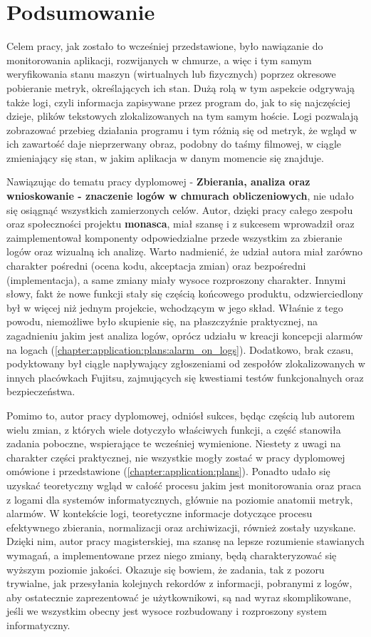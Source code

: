 \chapter[Podsumowanie]{Podsumowanie}
\label{chapter:summary}

Celem pracy, jak zostało to wcześniej przedstawione, było nawiązanie do monitorowania aplikacji, 
rozwijanych w chmurze, a więc i tym samym weryfikowania stanu maszyn (wirtualnych lub fizycznych) poprzez
okresowe pobieranie metryk, określających ich stan. Dużą rolą w tym aspekcie odgrywają także logi, czyli
informacja zapisywane przez program do, jak to się najczęściej dzieje, plików tekstowych zlokalizowanych
na tym samym hoście. Logi pozwalają zobrazować przebieg działania programu i tym różnią się od metryk, że
wgląd w ich zawartość daje nieprzerwany obraz, podobny do taśmy filmowej, w ciągle zmieniający się stan, w jakim
aplikacja w danym momencie się znajduje. 

Nawiązując do tematu pracy dyplomowej - \textbf{Zbierania, analiza oraz wnioskowanie - znaczenie logów w chmurach
    obliczeniowych}, nie udało się osiągnąć wszystkich zamierzonych celów. Autor, dzięki pracy całego zespołu oraz
społeczności projektu \textbf{monasca}, miał szansę i z sukcesem wprowadził oraz zaimplementował komponenty
odpowiedzialne przede wszystkim za zbieranie logów oraz wizualną ich analizę. Warto nadmienić, że udział autora
miał zarówno charakter pośredni (ocena kodu, akceptacja zmian) oraz bezpośredni (implementacja), a same zmiany
miały wysoce rozproszony charakter. Innymi słowy, fakt że nowe funkcji stały się częścią końcowego produktu, 
odzwierciedlony był w więcej niż jednym projekcie, wchodzącym w jego skład. Właśnie z tego powodu, niemożliwe było
skupienie się, na płaszczyźnie praktycznej, na zagadnieniu jakim jest analiza logów, oprócz udziału w kreacji
koncepcji alarmów na logach (\ref{chapter:application:plans:alarm_on_logs}). Dodatkowo, brak czasu, podyktowany był ciągle
napływający zgłoszeniami od zespołów zlokalizowanych w innych placówkach Fujitsu, zajmujących się kwestiami testów
funkcjonalnych oraz bezpieczeństwa.

Pomimo to, autor pracy dyplomowej, odniósł sukces, będąc częścią lub autorem wielu zmian, z których wiele dotyczyło
właściwych funkcji, a część stanowiła zadania poboczne, wspierające te wcześniej wymienione. Niestety z uwagi
na charakter części praktycznej, nie wszystkie mogły zostać w pracy dyplomowej omówione i przedstawione (\ref{chapter:application:plans}). Ponadto udało się uzyskać teoretyczny wgląd w całość procesu jakim
jest monitorowania oraz praca z logami dla systemów informatycznych, głównie na poziomie anatomii metryk, alarmów.
W kontekście logi, teoretyczne informacje dotyczące procesu efektywnego zbierania, normalizacji oraz archiwizacji, 
również zostały uzyskane. Dzięki nim, autor pracy magisterskiej, ma szansę na lepsze rozumienie stawianych
wymagań, a implementowane przez niego zmiany, będą charakteryzować się wyższym poziomie jakości. Okazuje się bowiem, że
zadania, tak z pozoru trywialne, jak przesyłania kolejnych rekordów z informacji, pobranymi z logów, aby ostatecznie
zaprezentować je użytkownikowi, są nad wyraz skomplikowane, jeśli we wszystkim obecny jest wysoce rozbudowany
i rozproszony system informatyczny.